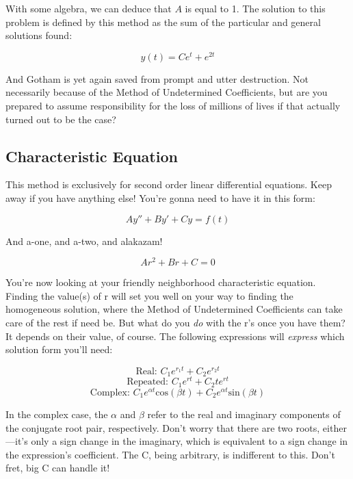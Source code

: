 \documentclass[10pt]{extarticle}
\begin{document}
\begin{multicols}{2}
With some algebra, we can deduce that \(A\) is equal to 1. The solution to this
problem is defined by this method as the sum of the particular and general
solutions found:

\begin{equation*}
    y(t) = Ce^t + e^{2t}
\end{equation*}

And Gotham is yet again saved from prompt and utter destruction. Not
necessarily because of the Method of Undetermined Coefficients, but are you
prepared to assume responsibility for the loss of millions of lives if that
actually turned out to be the case?


\subsection{Characteristic Equation}

This method is exclusively for second order linear differential equations. Keep
away if you have anything else! You're gonna need to have it in this form:

\begin{equation*}
    Ay'' + By' + Cy = f(t)
\end{equation*}

And a-one, and a-two, and alakazam!

\begin{equation*}
    Ar^2 + Br + C = 0
\end{equation*}

You're now looking at your friendly neighborhood characteristic equation.
Finding the value(s) of r will set you well on your way to finding the
homogeneous solution, where the Method of Undetermined Coefficients can take
care of the rest if need be. But what do you {\em do} with the r's once you
have them? It depends on their value, of course. The following expressions will
{\em express} which solution form you'll need:

\begin{equation*}
    \text{Real: } C_1e^{r_1t} + C_2e^{r_2t}
\end{equation*}
\begin{equation*}
    \text{Repeated: } C_1e^{rt} + C_2te^{rt}
\end{equation*}
\begin{equation*}
    \text{Complex: } C_1e^{\alpha t}\text{cos}(\beta t) + 
    C_2e^{\alpha t}\text{sin}(\beta t)
\end{equation*}

In the complex case, the $\alpha$ and $\beta$ refer to the real and imaginary
components of the conjugate root pair, respectively. Don't worry that there are
two roots, either---it's only a sign change in the imaginary, which is
equivalent to a sign change in the expression's coefficient. The C, being
arbitrary, is indifferent to this. Don't fret, big C can handle it!



\end{multicols}
\end{document}

